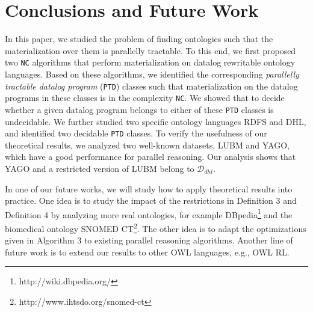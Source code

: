 \documentclass{article}
\begin{document}
\section{Conclusions and Future Work}

In this paper, we studied the problem of finding ontologies such that the materialization over them is parallelly tractable. To this end,
we first proposed two \texttt{NC} algorithms that perform materialization on datalog rewritable ontology languages.
Based on these algorithms, we identified the corresponding \emph{parallelly tractable datalog program} (\texttt{PTD}) classes such that materialization on the datalog programs in these classes is in the complexity \texttt{NC}.
We showed that to decide whether a given datalog program belongs to either of these \texttt{PTD} classes is undecidable. We further studied two specific ontology languages RDFS and DHL, and identified two decidable \texttt{PTD} classes. To verify the usefulness of our theoretical results, we analyzed two well-known datasets, LUBM and YAGO,
which have a good performance for parallel reasoning. Our analysis shows that YAGO and a
restricted version of LUBM belong to $\mathcal{D}_{dhl}$.

In one of our future works, we will study how to apply theoretical results into practice.
One idea is to study the impact of the restrictions in Definition 3 and Definition 4 by analyzing more real ontologies,
for example DBpedia\footnote{http://wiki.dbpedia.org/} and the biomedical ontology SNOMED CT\footnote{http://www.ihtsdo.org/snomed-ct}.
The other idea is to adapt the optimizations given in Algorithm 3 to existing parallel reasoning algorithms.
Another line of future work is to extend our results to other OWL languages, e.g., OWL RL.

\clearpage



\end{document}
